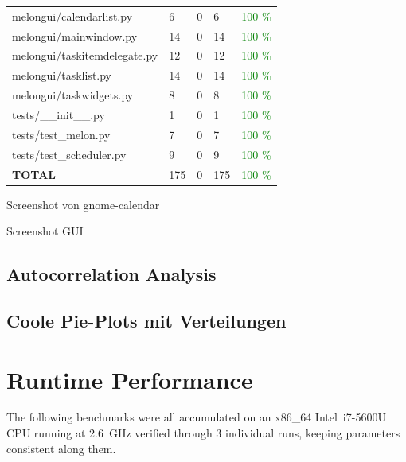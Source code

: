 \documentclass{prettytex/ox/mmsc-special-topic}
\begin{document}
\begin{table}[H]
\begin{tabular}{lllll}
      melongui/calendarlist.py        & 6         & 0        & 6         & \textcolor{green}{100 \%} \\
      melongui/mainwindow.py          & 14        & 0        & 14        & \textcolor{green}{100 \%} \\
      melongui/taskitemdelegate.py    & 12        & 0        & 12        & \textcolor{green}{100 \%} \\
      melongui/tasklist.py            & 14        & 0        & 14        & \textcolor{green}{100 \%} \\
      melongui/taskwidgets.py         & 8         & 0        & 8         & \textcolor{green}{100 \%} \\
      tests/\_\_init\_\_.py           & 1         & 0        & 1         & \textcolor{green}{100 \%} \\
      tests/test\_melon.py            & 7         & 0        & 7         & \textcolor{green}{100 \%} \\
      tests/test\_scheduler.py        & 9         & 0        & 9         & \textcolor{green}{100 \%} \\
      \hline
      \bf TOTAL                       & 175       & 0        & 175       & \textcolor{green}{100 \%} \\
      \hline
    \end{tabular}
  \end{table}

  Screenshot von gnome-calendar

  Screenshot GUI

  \subsection{Autocorrelation Analysis}
  \subsection{Coole Pie-Plots mit Verteilungen}

  \section{Runtime Performance}
  \label{sec:runtime}
  The following benchmarks were all accumulated on an x86\_64 Intel\textregistered \, i7-5600U CPU running at \SI{2.6}{\giga\hertz} verified through 3 individual runs, keeping parameters consistent along them.
\end{document}
